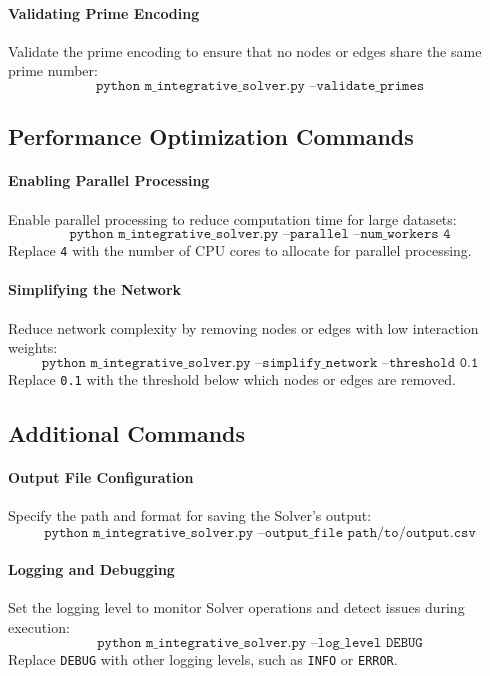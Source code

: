 \documentclass[%
 preprint, linenumbers,
 amsmath,amssymb,
 aps, physrev,
]{revtex4-2}
\begin{document}
\paragraph{Validating Prime Encoding}
Validate the prime encoding to ensure that no nodes or edges share the same prime number:
\[
\texttt{python m\_integrative\_solver.py --validate\_primes}
\]

\subsection*{Performance Optimization Commands}

\paragraph{Enabling Parallel Processing}
Enable parallel processing to reduce computation time for large datasets:
\[
\texttt{python m\_integrative\_solver.py --parallel --num\_workers 4}
\]
Replace \texttt{4} with the number of CPU cores to allocate for parallel processing.

\paragraph{Simplifying the Network}
Reduce network complexity by removing nodes or edges with low interaction weights:
\[
\texttt{python m\_integrative\_solver.py --simplify\_network --threshold 0.1}
\]
Replace \texttt{0.1} with the threshold below which nodes or edges are removed.

\subsection*{Additional Commands}

\paragraph{Output File Configuration}
Specify the path and format for saving the Solver’s output:
\[
\texttt{python m\_integrative\_solver.py --output\_file path/to/output.csv}
\]

\paragraph{Logging and Debugging}
Set the logging level to monitor Solver operations and detect issues during execution:
\[
\texttt{python m\_integrative\_solver.py --log\_level DEBUG}
\]
Replace \texttt{DEBUG} with other logging levels, such as \texttt{INFO} or \texttt{ERROR}.
\end{document}
